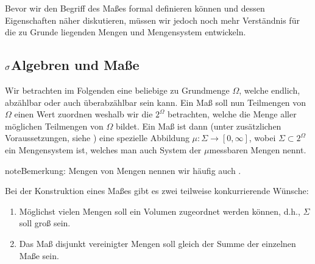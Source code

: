\documentclass[letterpaper,10pt,german]{jupyterBook}
\begin{document}
\sphinxAtStartPar
Bevor wir den Begriff des Maßes formal definieren können und dessen Eigenschaften näher diskutieren, müssen wir jedoch noch mehr Verständnis für die zu Grunde liegenden Mengen und Mengensystem entwickeln.


\subsection{\protect\(\sigma\protect\)\sphinxhyphen{}Algebren und Maße}
\label{\detokenize{masstheorie/masstheorie:sigma-algebren-und-masze}}\label{\detokenize{masstheorie/masstheorie:s-sigmaalg}}
\sphinxAtStartPar
Wir betrachten im Folgenden eine beliebige zu Grundmenge \(\Omega\), welche endlich, abzählbar oder auch überabzählbar sein kann. Ein Maß soll nun Teilmengen von \(\Omega\) einen Wert zuordnen weshalb wir die  \(2^\Omega\) betrachten, welche die Menge aller möglichen Teilmengen von \(\Omega\) bildet. Ein Maß ist dann (unter zusätzlichen Voraussetzungen, siehe {\hyperref[\detokenize{masstheorie/masstheorie:def:mass}]{}}) eine spezielle Abbildung \(\mu:\Sigma\to[0,\infty]\), wobei \(\Sigma\subset 2^\Omega\) ein Mengensystem ist, welches man auch System der \(\mu\)\sphinxhyphen{}messbaren Mengen nennt.

\begin{sphinxadmonition}{note}{Bemerkung:}
\sphinxAtStartPar
Mengen von Mengen nennen wir häufig auch .
\end{sphinxadmonition}

\sphinxAtStartPar
Bei der Konstruktion eines Maßes gibt es zwei teilweise konkurrierende Wünsche:
\begin{enumerate}
%
\item {} 
\sphinxAtStartPar
Möglichst vielen Mengen soll ein Volumen zugeordnet werden können, d.h., \(\Sigma\) soll groß sein.

\item {} 
\sphinxAtStartPar
Das Maß disjunkt vereinigter Mengen soll gleich der Summe der einzelnen Maße sein.

\end{enumerate}
\end{document}
